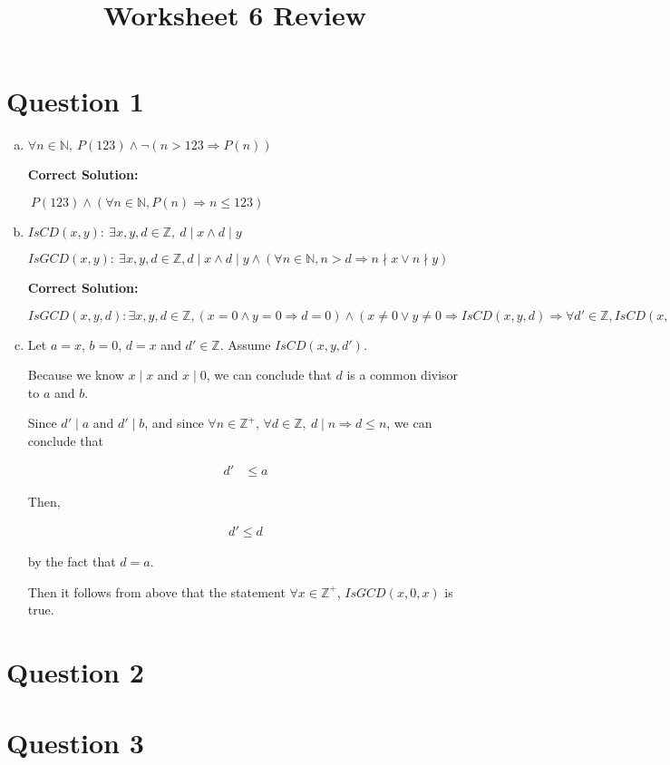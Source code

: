 \documentclass[12pt]{article}
\begin{document}
\title{Worksheet 6 Review}
\maketitle

\section*{Question 1}
\begin{enumerate}[a.]
    \item

    $\forall n \in \mathbb{N},\:P(123) \land \neg (n > 123 \Rightarrow P(n))$

    \bigskip

    \textbf{Correct Solution:}

    $\:P(123) \land (\forall n \in \mathbb{N}, P(n) \Rightarrow n \leq 123)$

    \item

    $IsCD(x,y):\:\exists x,y,d \in \mathbb{Z},\: d \mid x \land d \mid y$

    \bigskip

    $IsGCD(x,y):\:\exists x,y,d \in \mathbb{Z}, d \mid x \land d \mid y \land
    (\forall n \in \mathbb{N}, n > d \Rightarrow n \nmid x \lor n \nmid y)$

    \bigskip

    \textbf{Correct Solution:}

    $IsGCD(x,y,d):\exists x,y,d \in \mathbb{Z}, (x = 0 \land y = 0 \Rightarrow d = 0) \land (x \neq 0 \lor y \neq 0 \Rightarrow
    IsCD(x,y,d) \Rightarrow \forall d' \in \mathbb{Z}, IsCD(x,y,d') \Rightarrow d' \leq d)$

    \item

    Let $a = x$, $b = 0$, $d = x$ and $d' \in \mathbb{Z}$. Assume $IsCD(x,y,d')$.

    \bigskip

    Because we know $x \mid x$ and $x \mid 0$, we can conclude that $d$ is a common
    divisor to $a$ and $b$.

    \bigskip

    Since $d' \mid a$ and $d' \mid b$, and since $\forall n \in \mathbb{Z}^{+}$,
    $\forall d \in \mathbb{Z},\:d \mid n \Rightarrow d \leq n$, we can conclude
    that

    \begin{align}
        d' &\leq a
    \end{align}

    \bigskip

    Then,

    \begin{align}
        d' \leq d
    \end{align}

    by the fact that $d = a$.

    \bigskip

    Then it follows from above that the statement $\forall x \in \mathbb{Z}^{+}$,
    $IsGCD(x,0,x)$ is true.


\end{enumerate}

\section*{Question 2}

\section*{Question 3}
\end{document}
